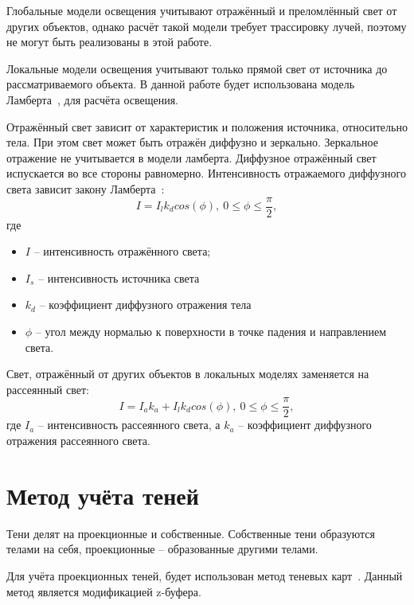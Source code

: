 Глобальные модели освещения учитывают отражённый и преломлённый свет от других объектов, однако расчёт такой модели требует трассировку лучей, поэтому не могут быть реализованы в этой работе.

Локальные модели освещения учитывают только прямой свет от источника до рассматриваемого объекта. В данной работе будет использована модель Ламберта~\cite{kazancev}, для расчёта освещения.

Отражённый свет зависит от характеристик и положения источника, относительно тела. При этом свет может быть отражён диффузно и зеркально. Зеркальное отражение не учитывается в модели ламберта. Диффузное отражённый свет испускается во все стороны равномерно. Интенсивность отражаемого диффузного света зависит закону Ламберта~\cite{kazancev}:
\begin{equation}
	\label{eq:lambert1}
	I = I_{l}k_dcos(\phi),\ 0\leq\phi\leq\frac{\pi}{2},
\end{equation}
где
\begin{itemize}
	\item $I$ -- интенсивность отражённого света;
	\item $I_s$ -- интенсивность источника света
	\item $k_d$ -- коэффициент диффузного отражения тела
	\item $\phi$ -- угол между нормалью к поверхности в точке падения и направлением света.
\end{itemize} 

Свет, отражённый от других объектов в локальных моделях заменяется на рассеянный свет:
\begin{equation}
	\label{eq:lambert2}
	I = I_ak_a + I_{l}k_dcos(\phi),\ 0\leq\phi\leq\frac{\pi}{2},
\end{equation}
где $I_a$ -- интенсивность рассеянного света, а $k_a$ -- коэффициент диффузного отражения рассеянного света. 

\section{Метод учёта теней}

Тени делят на проекционные и собственные. Собственные тени образуются телами на себя, проекционные -- образованные другими телами.

Для учёта проекционных теней, будет использован метод теневых карт~\cite{gabriella}. Данный метод является модификацией z-буфера.

